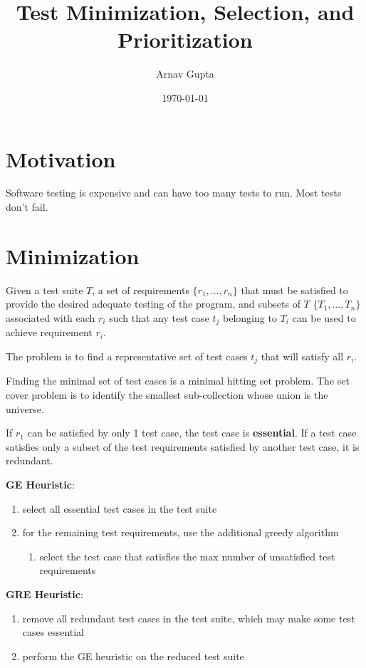\documentclass[11pt]{article}
\author{Arnav Gupta}
\date{\today}
\title{Test Minimization, Selection, and Prioritization}
\begin{document}
\maketitle
\tableofcontents

\section{Motivation}
\label{sec:orgbb834c7}
Software testing is expensive and can have too many tests to run.
Most tests don't fail.
\section{Minimization}
\label{sec:orge268da8}
Given a test suite \(T\), a set of requirements \(\{r_{1}, \dots, r_{n}\}\)
that must be satisfied to provide the desired adequate testing of the program,
and subsets of \(T\) \(\{T_{1}, \dots, T_{n}\}\) associated with each \(r_{i}\) such
that any test case \(t_{j}\) belonging to \(T_{i}\) can be used to achieve
requirement \(r_{i}\).

The problem is to find a representative set of test cases \(t_{j}\) that will satisfy
all \(r_{i}\).

Finding the minimal set of test cases is a minimal hitting set problem.
The set cover problem is to identify the smallest sub-collection whose union is the
universe.

If \(r_{1}\) can be satisfied by only 1 test case, the test case is \textbf{essential}.
If a test case satisfies only a subset of the test requirements satisfied by another
test case, it is redundant.

\textbf{GE Heuristic}:
\begin{enumerate}
\item select all essential test cases in the test suite
\item for the remaining test requirements, use the additional greedy algorithm
\begin{enumerate}
\item select the test case that satisfies the max number of unsatisfied test requirements
\end{enumerate}
\end{enumerate}

\textbf{GRE Heuristic}:
\begin{enumerate}
\item remove all redundant test cases in the test suite, which may make some test cases essential
\item perform the GE heuristic on the reduced test suite
\end{enumerate}
\end{document}
